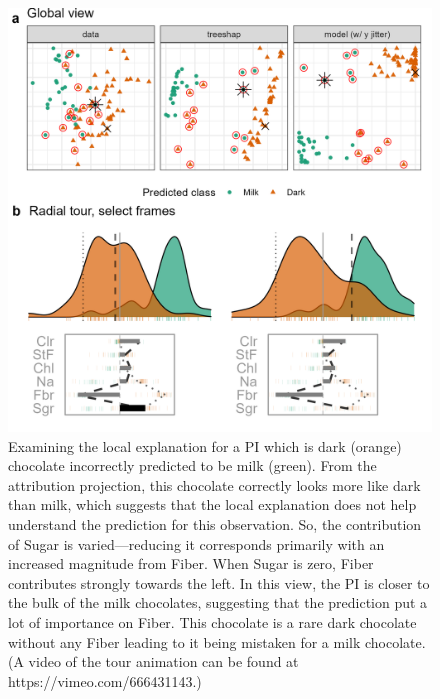 \documentclass[
]{jss}
\begin{document}
\begin{CodeChunk}
\begin{figure}

{\centering \includegraphics[width=1\linewidth]{./figures/case_chocolates} 

}

\caption[Examining the local explanation for a PI which is dark (orange) chocolate incorrectly predicted to be milk (green)]{Examining the local explanation for a PI which is dark (orange) chocolate incorrectly predicted to be milk (green). From the attribution projection, this chocolate correctly looks more like dark than milk, which suggests that the local explanation does not help understand the prediction for this observation. So, the contribution of Sugar is varied---reducing it corresponds primarily with an increased magnitude from Fiber. When Sugar is zero, Fiber contributes strongly towards the left. In this view, the PI is closer to the bulk of the milk chocolates, suggesting that the prediction put a lot of importance on Fiber. This chocolate is a rare dark chocolate without any Fiber leading to it being mistaken for a milk chocolate. (A video of the tour animation can be found at https://vimeo.com/666431143.)}\label{fig:casechocolates}
\end{figure}
\end{CodeChunk}
\end{document}
